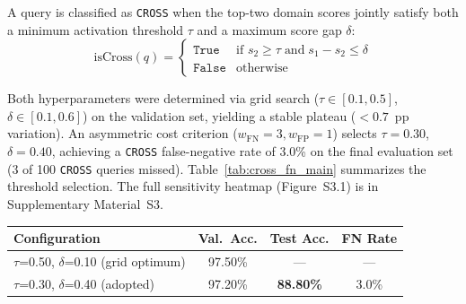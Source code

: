 \documentclass[a4paper,fleql,doubleblind]{cas-sc}
\begin{document}
A query is classified as \texttt{CROSS} when the top-two domain scores
jointly satisfy both a minimum activation threshold $\tau$ and a maximum
score gap $\delta$:
\begin{equation}
    \text{isCross}(q) =
    \begin{cases}
        \texttt{True}  & \text{if } s_2 \geq \tau \;\text{and}\;
                         s_1 - s_2 \leq \delta \\
        \texttt{False} & \text{otherwise}
    \end{cases}
    \label{eq:cross_detect}
\end{equation}

Both hyperparameters were determined via grid search
($\tau \in [0.1, 0.5]$, $\delta \in [0.1, 0.6]$) on the validation set,
yielding a stable plateau ($<0.7$~pp variation). An asymmetric cost
criterion ($w_{\text{FN}}=3, w_{\text{FP}}=1$) selects
$\tau = 0.30$, $\delta = 0.40$, achieving a \texttt{CROSS} false-negative rate
of 3.0\% on the final evaluation set (3 of 100 \texttt{CROSS} queries missed).
Table~\ref{tab:cross_fn_main} summarizes the threshold selection. The full sensitivity
heatmap (Figure~S3.1) is in Supplementary Material~S3.

\vspace{4pt}
\begin{center}
\begingroup
\renewcommand{\arraystretch}{1.2}
\label{tab:cross_fn_main}
\begin{tabular}{lccc}
\toprule
\textbf{Configuration} & \textbf{Val.\ Acc.} & \textbf{Test Acc.} & \textbf{FN Rate} \\
\midrule
$\tau$=0.50, $\delta$=0.10 (grid optimum) & 97.50\% & --- & --- \\
$\tau$=0.30, $\delta$=0.40 (adopted)      & 97.20\% & \textbf{88.80\%} & 3.0\% \\
\bottomrule
\end{tabular}
\endgroup
\end{center}
\vspace{4pt}
\end{document}
